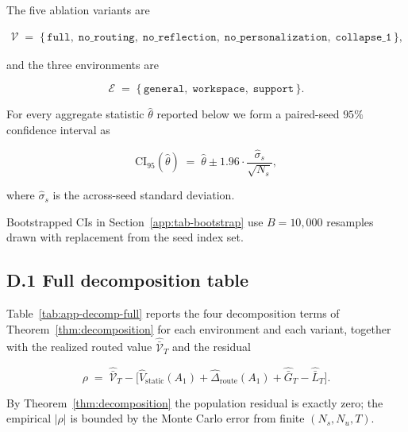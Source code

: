 \documentclass{article} %
\begin{document}
The five ablation variants are

\begin{align}
\label{eq:app-tab-variants}
\mathcal{V} \;=\; \{\,\texttt{full},\; \texttt{no\_routing},\; \texttt{no\_reflection},\; \texttt{no\_personalization},\; \texttt{collapse\_1}\,\},
\end{align}

and the three environments are

\begin{equation}
\label{eq:app-tab-envs}
\mathcal{E} \;=\; \{\,\texttt{general},\; \texttt{workspace},\; \texttt{support}\,\}.
\end{equation}

For every aggregate statistic $\widehat\theta$ reported below we form a paired-seed $95\%$ confidence interval as

\begin{equation}
\label{eq:app-tab-ci}
\mathrm{CI}_{95}(\widehat\theta) \;=\; \widehat\theta \pm 1.96\cdot \frac{\widehat\sigma_s}{\sqrt{N_s}},
\end{equation}

where $\widehat\sigma_s$ is the across-seed standard deviation.

Bootstrapped CIs in Section~\ref{app:tab-bootstrap} use $B=10{,}000$ resamples drawn with replacement from the seed index set.

\subsection{D.1 Full decomposition table}

\label{app:tab-decomp}

Table~\ref{tab:app-decomp-full} reports the four decomposition terms of Theorem~\ref{thm:decomposition} for each environment and each variant, together with the realized routed value $\widehat{\bar{\mathcal V}}_T$ and the residual

\begin{equation}
\label{eq:app-tab-residual}
\rho \;=\; \widehat{\bar{\mathcal V}}_T - \big[\widehat V_{\mathrm{static}}(A_1) + \widehat\Delta_{\mathrm{route}}(A_1) + \widehat{\bar G}_T - \widehat{\bar L}_T\big].
\end{equation}

By Theorem~\ref{thm:decomposition} the population residual is exactly zero; the empirical $|\rho|$ is bounded by the Monte Carlo error from finite $(N_s,N_u,T)$.
\end{document}
